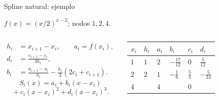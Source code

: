 \documentclass[main.tex]{subfiles}
\begin{document}
\begin{frame}[t]{Spline natural: ejemplo}
\par\noindent\begin{minipage}[t][9mm][t]{\textwidth}\small\strut $f(x)=(x/2)^{x-2}$; nodos $1,2,4$.\end{minipage}\par\nointerlineskip
\begin{columns}[T]\scriptsize\begin{align*}
h_i&=x_{i+1}-x_i,\qquad a_i=f(x_i),\\
d_i&=\frac{c_{i+1}-c_i}{3h_i},\\
b_i&=\frac{a_{i+1}-a_i}{h_i}-\frac{h_i}{3}(2c_i+c_{i+1}).
\end{align*}\scriptsize\[S_i(x)=a_i+b_i(x-x_i)\]\[{}+c_i(x-x_i)^2+d_i(x-x_i)^3.\]\begin{minipage}[t]{\textwidth}\begingroup\scriptsize\setlength{\tabcolsep}{2pt}\begin{center}\begin{tabular}{|C{.12\textwidth}|C{.12\textwidth}|C{.12\textwidth}|C{.12\textwidth}|C{.12\textwidth}|C{.12\textwidth}|}\hline
\rule[-2mm]{0pt}{6mm}$x_i$&$h_i$&$a_i$&$b_i$&$c_i$&$d_i$\\\hline
\rule[-2.5mm]{0pt}{7mm}$1$&$1$&$2$&$-\frac{17}{12}$&$0$&$\frac{5}{12}$\\\hline
\rule[-2.5mm]{0pt}{7mm}$2$&$2$&$1$&$-\frac{1}{6}$&$\frac{5}{4}$&$-\frac{5}{24}$\\\hline
\rule[-2.5mm]{0pt}{7mm}$4$&&$4$&&$0$&\\\hline
\end{tabular}\end{center}\endgroup\end{minipage}\par
\end{columns}
\end{frame}
\end{document}
